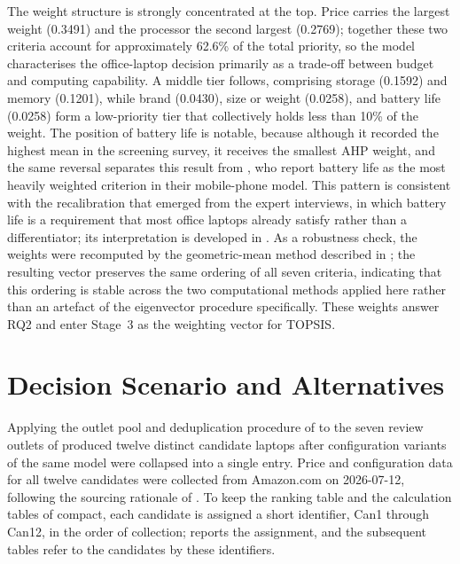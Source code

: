 The weight structure is strongly concentrated at the top. Price carries the largest weight
(0.3491) and the processor the second largest (0.2769); together these two criteria
account for approximately 62.6\% of the total priority, so the model characterises the
office-laptop decision primarily as a trade-off between budget and computing capability.
A middle tier follows, comprising storage (0.1592) and memory (0.1201), while brand
(0.0430), size or weight (0.0258), and battery life (0.0258) form a low-priority tier that
collectively holds less than 10\% of the weight. The position of battery life is notable,
because although it recorded the highest mean in the screening survey, it receives the
smallest AHP weight, and the same reversal separates this result from
\textcite{weng_siew_lam_evaluation_2023}, who report battery life as the most heavily
weighted criterion in their mobile-phone model. This pattern is consistent with the
recalibration that emerged from the expert interviews, in which battery life is a
requirement that most office laptops already satisfy rather than a differentiator; its
interpretation is developed in . As a robustness check, the weights
were recomputed by the geometric-mean method described in ; the resulting
vector preserves the same ordering of all seven criteria, indicating that this ordering is
stable across the two computational methods applied here rather than an artefact of the
eigenvector procedure specifically. These weights answer RQ2 and enter Stage~3 as the
weighting vector for TOPSIS.

\section{Decision Scenario and Alternatives}\label{sec:scenario}

Applying the outlet pool and deduplication procedure of  to the
seven review outlets of  produced twelve distinct candidate
laptops after configuration variants of the same model were collapsed into a single entry.
Price and configuration data for all twelve candidates were collected from Amazon.com on
2026-07-12, following the sourcing rationale of . To keep the
ranking table and the calculation tables of  compact, each candidate
is assigned a short identifier, Can1 through Can12, in the order of collection;
 reports the assignment, and the subsequent tables refer to the
candidates by these identifiers.

